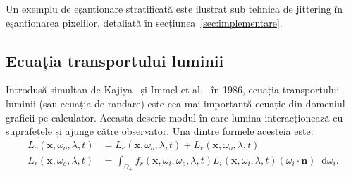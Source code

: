 \documentclass[12pt,a4paper]{report}
\newcommand*\diff{\mathop{}\!\mathrm{d}}
\numberwithin{equation}{section} %
\begin{document}
Un exemplu de eșantionare stratificată este ilustrat sub tehnica de jittering
în eșantionarea pixelilor, detaliată în secțiunea~\ref{sec:implementare}.

\subsection{Ecuația transportului luminii}

Introdusă simultan de Kajiya~\cite{Kajiya} și Immel et al.~\cite{Immel} în 1986,
ecuația transportului luminii (sau ecuația de randare) este cea mai importantă ecuație din domeniul
graficii pe calculator. Aceasta descrie modul în care lumina interacționează
cu suprafețele și ajunge către observator. Una dintre formele acesteia este:
\begin{equation}
	\label{eq:light_transport}
	\begin{aligned}
		L_o(\mathbf{x}, \omega_o, \lambda, t) & = L_e(\mathbf{x}, \omega_o, \lambda, t) + L_r(\mathbf{x}, \omega_o, \lambda, t)                                                                     \\
		L_r(\mathbf{x}, \omega_o, \lambda, t) & = \int_{\Omega_+} f_r(\mathbf{x}, \omega_i, \omega_o, \lambda, t) L_i(\mathbf{x}, \omega_i, \lambda, t) (\omega_i \cdot \mathbf{n}) \diff \omega_i.
	\end{aligned}
\end{equation}
\end{document}
